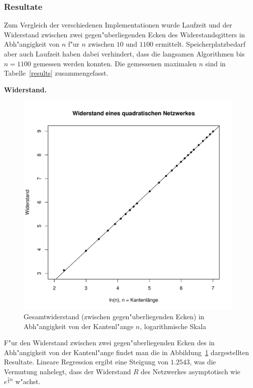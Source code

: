 \subsubsection{Resultate}
Zum Vergleich der verschiedenen Implementationen wurde Laufzeit
und der Widerstand zwischen zwei gegen"uberliegenden Ecken des
Widerstandsgitters in Abh"angigkeit von $n$ f"ur $n$ zwischen $10$ und
$1100$ ermittelt. Speicherplatzbedarf aber auch Laufzeit haben dabei
verhindert, dass die langsamen Algorithmen bis $n=1100$ gemessen werden
konnten. Die gemessenen maximalen $n$ sind in Tabelle~\ref{results}
zusammengefasst.

\medskip
{\parindent0pt
{\bf Widerstand.}}
\begin{figure}
\begin{center}
\includegraphics[width=\hsize]{graphics/resistance}
\end{center}
\caption{Gesamtwiderstand (zwischen gegen"uberliegenden Ecken)
in Abh"angigkeit von der Kantenl"ange $n$,
logarithmische Skala\label{resistance}}
\end{figure}
F"ur den Widerstand zwischen zwei gegen"uberliegenden Ecken des
in Abh"angigkeit von der Kantenl"ange findet man die in
Abbildung~\ref{resistance} dargestellten Resultate. Lineare Regression 
ergibt eine Steigung von $1.2543$, was die Vermutung nahelegt, dass der
Widerstand $R$ des Netzwerkes asymptotisch wie $e^{\frac54n}$ w"achst.

